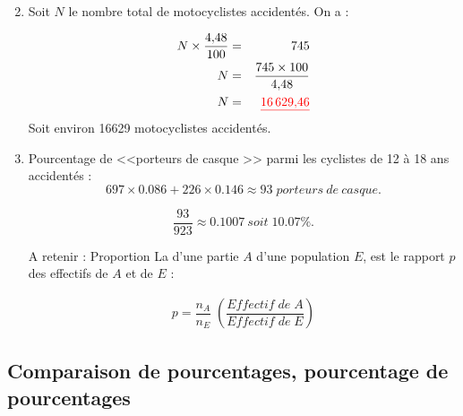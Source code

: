 \documentclass[xcolor={dvipsnames}]{beamer}
\begin{document}
\begin{frame}{}
	\begin{enumerate}%
		\setcounter{enumi}{1}
		\item Soit $N$ le nombre total de motocyclistes accidentés. On a :\pause
		
		\begin{eqnarray*}
			N \times \dfrac{\num{4.48}}{100} &=& 745 \\
			N &=& \dfrac{745 \times 100}{\num{4.48}} \\
			N &=&  \textcolor{red}{\underline{\textbf{\num{16629.46}}}}
		\end{eqnarray*}
		Soit environ \num{16629} motocyclistes accidentés.
			
	\end{enumerate}
\end{frame}

\begin{frame}{}
\begin{enumerate}%
	\setcounter{enumi}{2}
		\item Pourcentage de <<porteurs de casque >> parmi les cyclistes de 12 à 18 ans accidentés : \pause 
		\begin{equation*}
			\num{697} \times \num{0.086} + \num{226} \times \num{0.146} \approx 93 \; porteurs \: de \: casque.
		\end{equation*}
		
		\begin{equation*}
			\dfrac{93}{923} \approx \num{0.1007} \: soit \; \num{10.07}\%. 
		\end{equation*}\pause
		
	\begin{alertblock}{A retenir : Proportion}
		La  d'une partie $A$ d'une population $E$, est le rapport $p$ des effectifs de $A$ et de $E$ :
		
		\begin{eqnarray*}
			p = \dfrac{n_A}{n_E} \; \left(\dfrac{Effectif\;de\; A}{Effectif\; de\; E}\right)
		\end{eqnarray*}
	\end{alertblock}
\end{enumerate}
\end{frame}		


\subsection{Comparaison de pourcentages, pourcentage de pourcentages}
\end{document}
